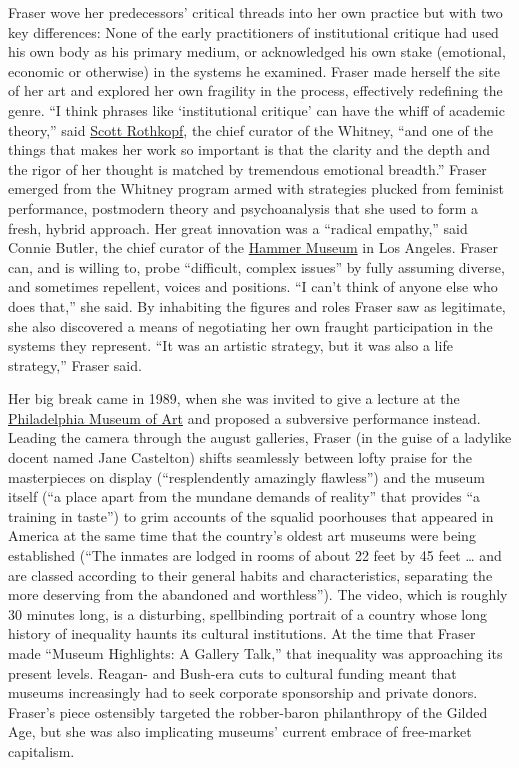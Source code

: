 Fraser wove her predecessors' critical threads into her own practice but
with two key differences: None of the early practitioners of
institutional critique had used his own body as his primary medium, or
acknowledged his own stake (emotional, economic or otherwise) in the
systems he examined. Fraser made herself the site of her art and
explored her own fragility in the process, effectively redefining the
genre. ``I think phrases like `institutional critique' can have the
whiff of academic theory,'' said
\href{https://www.nytimes3xbfgragh.onion/2016/05/03/arts/design/for-scott-rothkopf-a-swift-ascendance-in-the-whitney-hierarchy.html}{Scott
Rothkopf}, the chief curator of the Whitney, ``and one of the things
that makes her work so important is that the clarity and the depth and
the rigor of her thought is matched by tremendous emotional breadth.''
Fraser emerged from the Whitney program armed with strategies plucked
from feminist performance, postmodern theory and psychoanalysis that she
used to form a fresh, hybrid approach. Her great innovation was a
``radical empathy,'' said Connie Butler, the chief curator of the
\href{https://hammer.ucla.edu/}{Hammer Museum} in Los Angeles. Fraser
can, and is willing to, probe ``difficult, complex issues'' by fully
assuming diverse, and sometimes repellent, voices and positions. ``I
can't think of anyone else who does that,'' she said. By inhabiting the
figures and roles Fraser saw as legitimate, she also discovered a means
of negotiating her own fraught participation in the systems they
represent. ``It was an artistic strategy, but it was also a life
strategy,'' Fraser said.

Her big break came in 1989, when she was invited to give a lecture at
the \href{https://philamuseum.org/}{Philadelphia Museum of Art} and
proposed a subversive performance instead. Leading the camera through
the august galleries, Fraser (in the guise of a ladylike docent named
Jane Castelton) shifts seamlessly between lofty praise for the
masterpieces on display (``resplendently amazingly flawless'') and the
museum itself (``a place apart from the mundane demands of reality''
that provides ``a training in taste'') to grim accounts of the squalid
poorhouses that appeared in America at the same time that the country's
oldest art museums were being established (``The inmates are lodged in
rooms of about 22 feet by 45 feet \ldots{} and are classed according to
their general habits and characteristics, separating the more deserving
from the abandoned and worthless''). The video, which is roughly 30
minutes long, is a disturbing, spellbinding portrait of a country whose
long history of inequality haunts its cultural institutions. At the time
that Fraser made ``Museum Highlights: A Gallery Talk,'' that inequality
was approaching its present levels. Reagan- and Bush-era cuts to
cultural funding meant that museums increasingly had to seek corporate
sponsorship and private donors. Fraser's piece ostensibly targeted the
robber-baron philanthropy of the Gilded Age, but she was also
implicating museums' current embrace of free-market capitalism.

